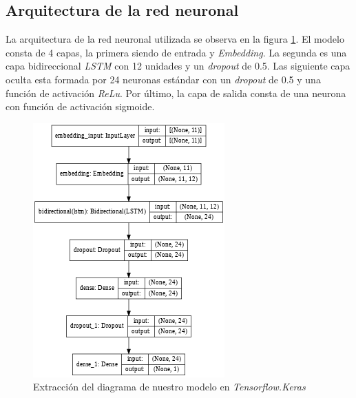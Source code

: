 \documentclass[sigconf, nonacm, spanish]{acmart}
\begin{document}
\subsection{Arquitectura de la red neuronal}

La arquitectura de la red neuronal utilizada se observa en la figura \ref{fig:architecture}. El modelo consta de 4 capas, la primera siendo de entrada y \textit{Embedding}. La segunda es una capa bidireccional \textit{LSTM} con 12 unidades y un \textit{dropout} de 0.5. Las siguiente capa oculta esta formada por 24 neuronas estándar con un \textit{dropout} de 0.5 y una función de activación \textit{ReLu}. Por último, la capa de salida consta de una neurona con función de activación sigmoide.


\begin{figure}
  \centering
  \includegraphics[width=\linewidth]{figures/arquitectura}
  \caption{Extracción del diagrama de nuestro modelo en \textit{Tensorflow.Keras}}
  \label{fig:architecture}
\end{figure}
\end{document}
